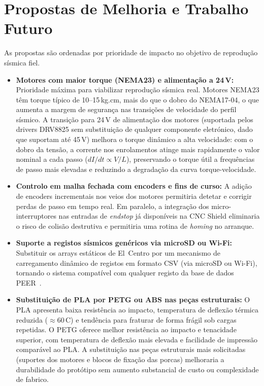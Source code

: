 \section{Propostas de Melhoria e Trabalho Futuro}
\label{sec:trabalho-futuro}

As propostas são ordenadas por prioridade de impacto no objetivo de reprodução sísmica fiel.

\begin{itemize}
    \item \textbf{Motores com maior torque (NEMA23) e alimentação a 24\,V:} Prioridade máxima para viabilizar reprodução sísmica real. Motores NEMA23 têm torque típico de 10--15\,kg.cm, mais do que o dobro do NEMA17-04, o que aumenta a margem de segurança nas transições de velocidade do perfil sísmico. A transição para 24\,V de alimentação dos motores (suportada pelos drivers DRV8825 sem substituição de qualquer componente eletrónico, dado que suportam até 45\,V) melhora o torque dinâmico a alta velocidade: com o dobro da tensão, a corrente nos enrolamentos atinge mais rapidamente o valor nominal a cada passo ($dI/dt \propto V/L$), preservando o torque útil a frequências de passo mais elevadas e reduzindo a degradação da curva torque-velocidade.

    \item \textbf{Controlo em malha fechada com encoders e fins de curso:} A adição de encoders incrementais nos veios dos motores permitiria detetar e corrigir perdas de passo em tempo real. Em paralelo, a integração dos micro-interruptores nas entradas de \textit{endstop} já disponíveis na CNC Shield eliminaria o risco de colisão destrutiva e permitiria uma rotina de \textit{homing} no arranque.

    \item \textbf{Suporte a registos sísmicos genéricos via microSD ou Wi-Fi:} Substituir os arrays estáticos de El~Centro por um mecanismo de carregamento dinâmico de registos em formato CSV (via microSD ou Wi-Fi), tornando o sistema compatível com qualquer registo da base de dados PEER~\cite{PEERDatabase}.

    \item \textbf{Substituição de PLA por PETG ou ABS nas peças estruturais:} O PLA apresenta baixa resistência ao impacto, temperatura de deflexão térmica reduzida ($\approx$60\,\textdegree{}C) e tendência para fraturar de forma frágil sob cargas repetidas. O PETG oferece melhor resistência ao impacto e tenacidade superior, com temperatura de deflexão mais elevada e facilidade de impressão comparável ao PLA. A substituição nas peças estruturais mais solicitadas (suportes dos motores e blocos de fixação das porcas) melhoraria a durabilidade do protótipo sem aumento substancial de custo ou complexidade de fabrico.
\end{itemize}
